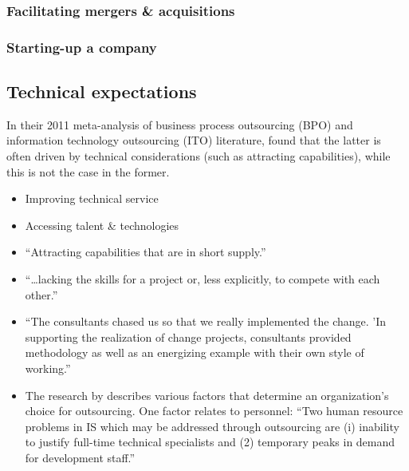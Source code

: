 \documentclass[12pt]{article}
\providecommand{\tightlist}{%
  \setlength{\itemsep}{0pt}\setlength{\parskip}{0pt}}
\begin{document}
\hypertarget{facilitating-mergers-acquisitions}{%
\subsubsection{Facilitating mergers \&
acquisitions}\label{facilitating-mergers-acquisitions}}

\hypertarget{starting-up-a-company}{%
\subsubsection{Starting-up a company}\label{starting-up-a-company}}

\hypertarget{technical-expectations}{%
\subsection{Technical expectations}\label{technical-expectations}}

In their 2011 meta-analysis of business process outsourcing (BPO) and
information technology outsourcing (ITO) literature, \citet{lacity2011}
found that the latter is often driven by technical considerations (such
as attracting capabilities), while this is not the case in the former.

\begin{itemize}
\tightlist
\item
  Improving technical service
\item
  Accessing talent \& technologies
\item
  ``Attracting capabilities that are in short supply.''
  \citet[52]{aubert1996}
\item
  ``\ldots lacking the skills for a project or, less explicitly, to
  compete with each other.'' \citep[ 233]{sturdy1998}
\item
  ``The consultants chased us so that we really implemented the change.
  'In supporting the realization of change projects, consultants
  provided methodology as well as an energizing example with their own
  style of working.'' \citep[ 54]{werr2002}
\item
  The research by \citet{ketler1993} describes various factors that
  determine an organization's choice for outsourcing. One factor relates
  to personnel: ``Two human resource problems in IS which may be
  addressed through outsourcing are (i) inability to justify full-time
  technical specialists and (2) temporary peaks in demand for
  development staff.'' \citet{ketler1993}
\end{itemize}
\end{document}

